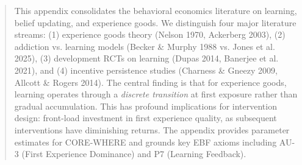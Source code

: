 \documentclass[11pt, a4paper]{article}
\begin{document}

\begin{abstract}
This appendix consolidates the behavioral economics literature on learning, belief updating, and experience goods. We distinguish four major literature streams: (1) experience goods theory (Nelson 1970, Ackerberg 2003), (2) addiction vs. learning models (Becker \& Murphy 1988 vs. Jones et al. 2025), (3) development RCTs on learning (Dupas 2014, Banerjee et al. 2021), and (4) incentive persistence studies (Charness \& Gneezy 2009, Allcott \& Rogers 2014). The central finding is that for experience goods, learning operates through a \textit{discrete transition} at first exposure rather than gradual accumulation. This has profound implications for intervention design: front-load investment in first experience quality, as subsequent interventions have diminishing returns. The appendix provides parameter estimates for CORE-WHERE and grounds key EBF axioms including AU-3 (First Experience Dominance) and P7 (Learning Feedback).
\end{abstract}


\end{document}
